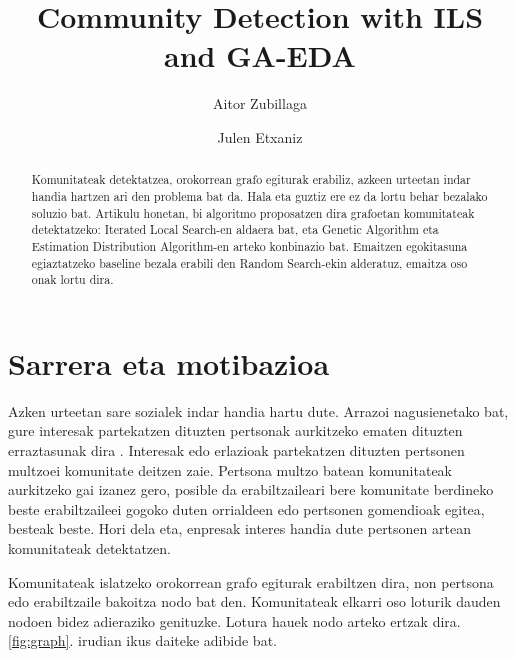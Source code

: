 \documentclass[sigconf]{acmart}
\begin{document}
\title{Community Detection with ILS and GA-EDA}

\author{Aitor Zubillaga}

\author{Julen Etxaniz}



\begin{abstract}

Komunitateak detektatzea, orokorrean grafo egiturak erabiliz, azkeen urteetan indar handia hartzen ari den problema bat da. Hala eta guztiz ere ez da lortu behar bezalako soluzio bat. Artikulu honetan, bi algoritmo proposatzen dira grafoetan komunitateak detektatzeko: Iterated Local Search-en aldaera bat, eta Genetic Algorithm eta Estimation Distribution Algorithm-en arteko konbinazio bat. Emaitzen egokitasuna egiaztatzeko baseline bezala erabili den Random Search-ekin alderatuz, emaitza oso onak lortu dira.
\end{abstract}


\maketitle

\section{Sarrera eta motibazioa}

Azken urteetan sare sozialek indar handia hartu dute. Arrazoi nagusienetako bat, gure interesak partekatzen dituzten pertsonak aurkitzeko ematen dituzten erraztasunak dira \cite{clauset2004finding}. Interesak edo erlazioak partekatzen dituzten pertsonen multzoei komunitate deitzen zaie. Pertsona multzo batean komunitateak aurkitzeko gai izanez gero, posible da erabiltzaileari bere komunitate berdineko beste erabiltzaileei gogoko duten orrialdeen edo pertsonen gomendioak egitea, besteak beste. Hori dela eta, enpresak interes handia dute pertsonen artean komunitateak detektatzen.

Komunitateak islatzeko orokorrean grafo egiturak erabiltzen dira, non pertsona edo erabiltzaile bakoitza nodo bat den. Komunitateak elkarri oso loturik dauden nodoen bidez adieraziko genituzke. Lotura hauek nodo arteko ertzak dira. 
\ref{fig:graph}. irudian ikus daiteke adibide bat.
\end{document}
